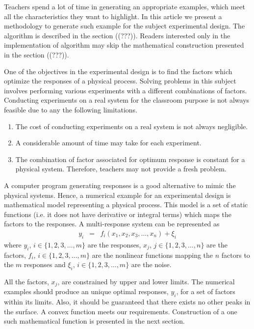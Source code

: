 \documentclass[twocolumn]{svjour3}          %
\begin{document}
	\par
	Teachers spend a lot of time in generating an appropriate examples, which meet all the characteristics they want to highlight. In this article we present a methodology to generate such example for the subject experimental design. The algorithm is described in the section ((???)). Readers interested only in the implementation of algorithm may skip the mathematical construction presented in the section ((???)).
	\par
	One of the objectives in the experimental design is to find the factors which optimize the responses of a physical process. Solving problems in this subject involves performing various experiments with a different combinations of factors. Conducting experiments on a real system for the classroom purpose is not always feasible due to any the following limitations.
	\begin{enumerate}
		\item The cost of conducting experiments on a real system is not always negligible.
		\item A considerable amount of time may take for each experiment.
		\item The combination of factor associated for optimum response is constant for a physical system. Therefore, teachers may not provide a fresh problem.
	\end{enumerate}
	\par
	A computer program generating responses is a good alternative to mimic the physical systems. Hence, a numerical example for an experimental design is mathematical model representing a physical process. This model is a set of static functions (i.e. it does not have derivative or integral terms) which maps the factors to the responses. A multi-response system can be represented as
	\begin{eqnarray}
	y_i &=& f_i(x_1, x_2, x_3, \dots, x_n) + \xi_i \label{Eqn:Function}
	\end{eqnarray}
	\noindent where $y_i$, $i\in \{1,2,3, \dots, m\}$ are the responses, $x_j$, $j\in \{1,2,3, \dots, n\}$ are the factors, $f_i$, $i\in \{1,2,3, \dots, m\}$ are the nonlinear functions mapping the $n$ factors to the $m$ responses and $\xi_i$, $i\in \{1,2,3, \dots, m\}$ are the noise.
	\par
	All the factors, $x_j$, are constrained by upper and lower limits. The numerical examples should produce an unique optimal responses, $y_i$, for a set of factors within its limits. Also, it should be guaranteed that there exists no other peaks in the surface. A convex function meets our requirements. Construction of a one such mathematical function is presented in the next section.
\end{document}
